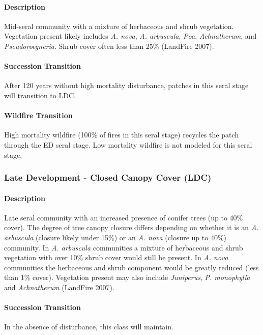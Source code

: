 \paragraph{Description} Mid-seral community with a mixture of herbaceous and shrub vegetation. Vegetation present likely includes \emph{A. nova}, \emph{A. arbuscula}, \emph{Poa}, \emph{Achnatherum}, and \emph{Pseudoroegneria}.  Shrub cover often less than 25\% (LandFire 2007).

\paragraph{Succession Transition} After 120 years without high mortality disturbance, patches in this seral stage will transition to LDC. 

\paragraph{Wildfire Transition} High mortality wildfire (100\% of fires in this seral stage) recycles the patch through the ED seral stage. Low mortality wildfire is not modeled for this seral stage.

\noindent\hrulefill


\subsubsection{Late Development - Closed Canopy Cover (LDC)} 

\paragraph{Description} Late seral community with an increased presence of conifer trees (up to 40\% cover). The degree of tree canopy closure differs depending on whether it is an \emph{A. arbuscula} (closure likely under 15\%) or an \emph{A. nova} (closure up to 40\%) community. In \emph{A. arbuscula} communities a mixture of herbaceous and shrub vegetation with over 10\% shrub cover would still be present. In \emph{A. nova} communities the herbaceous and shrub component would be greatly reduced (less than 1\% cover). Vegetation present may also include \emph{Juniperus}, \emph{P. monophylla} and \emph{Achnatherum} (LandFire 2007).

\paragraph{Succession Transition} In the absence of disturbance, this class will maintain. 

